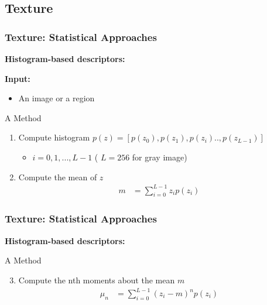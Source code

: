 \documentclass[english,11pt,table,handout]{beamer}
\begin{document}
\subsection{Texture}
\frame
{
	\frametitle{Texture: Statistical Approaches}
	\large
	\textbf{Histogram-based descriptors: }
	\newline
	
	\textbf{Input: }
	\begin{itemize}
		\item An image or a region
	\end{itemize}
	
	\begin{block}{A Method}
		\begin{enumerate}
			\item Compute histogram $p(z) = \left[p(z_0), p(z_1), p(z_i).., p(z_{L-1}) \right]$
				\begin{itemize}
					\item $i = 0, 1, ..., L-1$ ( $L=256$ for gray image)
				\end{itemize}
			\item Compute the mean of $z$
				\begin{equation}
				\begin{split}
				\nonumber
					m &= \sum_{i=0}^{L-1}{z_ip(z_i)}
				\end{split}
				\end{equation}
		\end{enumerate}
	\end{block}
	
}

\frame
{
	\frametitle{Texture: Statistical Approaches}
	\large
	\textbf{Histogram-based descriptors: }
	\newline

	\begin{block}{A Method}
		\begin{enumerate}
			\setcounter{enumi}{2}
	
			\item Compute the nth moments about the mean $m$
			\begin{equation}
			\begin{split}
			\nonumber
			\mu_n &= \sum_{i=0}^{L-1}{(z_i - m)^np(z_i)}
			\end{split}
			\end{equation}
		\end{enumerate}
	\end{block}
	
}
\end{document}
